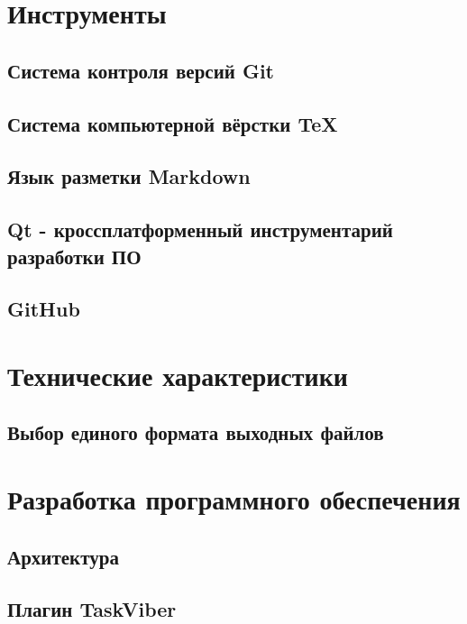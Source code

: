 \section{Инструменты}
\setcounter{figure}{0}
\subsection{Система контроля версий Git}

\subsection{Система компьютерной вёрстки \TeX}

\subsection{Язык разметки Markdown}
\label{sec:markdown}
\subsection{Qt - кроссплатформенный инструментарий разработки ПО}

\subsection{GitHub}


\section{Технические характеристики}

\subsection{Выбор единого формата выходных файлов}


\clearpage
\section{Разработка программного обеспечения}
\setcounter{figure}{0}
 
\subsection{Архитектура}


\newpage
\subsection{Плагин TaskViber}


